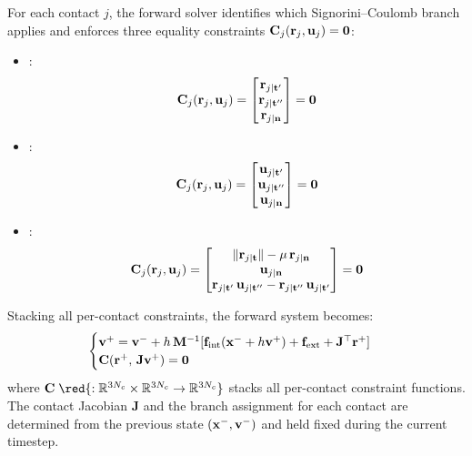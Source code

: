 For each contact $j$, the forward solver identifies which Signorini--Coulomb branch applies and enforces three equality constraints $\mathbf{C}_j(\mathbf{r}_j, \mathbf{u}_j) = \mathbf{0}$:
\begin{itemize}
    \item {}:%
    \begin{equation}
        \mathbf{C}_j(\mathbf{r}_j, \mathbf{u}_j) = 
        \begin{bmatrix}
            \mathbf{r}_{j\mid\mathbf{t}'} \\
            \mathbf{r}_{j\mid\mathbf{t}''} \\
            \mathbf{r}_{j\mid\mathbf{n}}
        \end{bmatrix} = \mathbf{0}
    \end{equation}
    \item {}:%
    \begin{equation}
        \mathbf{C}_j(\mathbf{r}_j, \mathbf{u}_j) = 
        \begin{bmatrix}
            \mathbf{u}_{j\mid\mathbf{t}'} \\
            \mathbf{u}_{j\mid\mathbf{t}''} \\
            \mathbf{u}_{j\mid\mathbf{n}}
        \end{bmatrix} = \mathbf{0}
    \end{equation}
    \item {}:%
    \begin{equation}
        \mathbf{C}_j(\mathbf{r}_j, \mathbf{u}_j) = 
        \begin{bmatrix}
            \|\mathbf{r}_{j\mid\mathbf{t}}\| - \mu\,\mathbf{r}_{j\mid\mathbf{n}} \\
            \mathbf{u}_{j\mid\mathbf{n}} \\
            \mathbf{r}_{j\mid\mathbf{t}'}\,\mathbf{u}_{j\mid\mathbf{t}''} -
            \mathbf{r}_{j\mid\mathbf{t}''}\,\mathbf{u}_{j\mid\mathbf{t}'}
        \end{bmatrix} = \mathbf{0}
    \end{equation}
\end{itemize}
\noindent Stacking all per-contact constraints, the forward system becomes:
\begin{equation}
\label{eq:diff_cloth_PD_contact_impl_system}
    \begin{cases}
        \mathbf{v}^+ = \mathbf{v}^- + h\,\mathbf{M}^{-1}[\mathbf{f}_{\text{int}}(\mathbf{x}^- + h\mathbf{v}^+) + \mathbf{f}_{\text{ext}} + \mathbf{J}^\top\mathbf{r}^+] \\
        \mathbf{C}(\mathbf{r}^+,\, \mathbf{J}\mathbf{v}^+) = \mathbf{0}
    \end{cases}
\end{equation}
where $\C\;\red{: \RR^{3N_c}\times \RR^{3N_c} \rightarrow \RR^{3N_c}}$ stacks all per-contact constraint functions. The contact Jacobian $\mathbf{J}$ and the branch assignment for each contact are determined from the previous state $(\mathbf{x}^-, \mathbf{v}^-)$ and held fixed during the current timestep.

